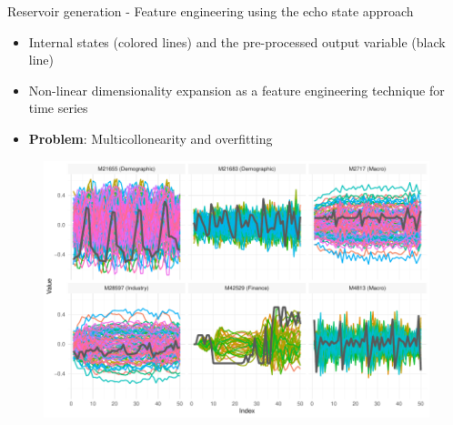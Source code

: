 \documentclass[aspectratio=169]{beamer}
\begin{document}
\begin{frame}[t]{Reservoir generation - Feature engineering using the echo state approach}
    \begin{minipage}[t]{0.3\textwidth}
        \vspace{0pt}
        \begin{itemize}
            \item Internal states (colored lines) and the pre-processed output variable (black line)
			\item Non-linear dimensionality expansion as a feature engineering technique for time series
			\item \textbf{Problem}: Multicollonearity and overfitting
        \end{itemize}
    \end{minipage}%
    \hfill
    \begin{minipage}[t]{0.7\textwidth}
        \vspace{0pt}
 		\begin{figure}[H]
		\center
			\includegraphics[scale=0.7]{figures/figure_05_model_states_wide.pdf}
		\end{figure}
    \end{minipage}
\end{frame}
\end{document}
